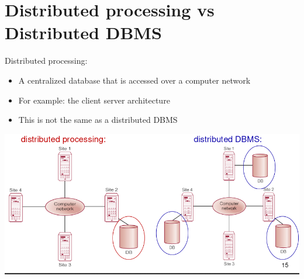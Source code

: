 \documentclass{article}[18pt]
\begin{document}
\section{Distributed processing vs Distributed DBMS}
Distributed processing:
\begin{itemize}
	\item A centralized database that is accessed over a computer network
	\item For example: the client server architecture
	\item This is not the same as a distributed DBMS
\end{itemize}
\begin{center}
	\includegraphics[scale=0.7]{processing}
\end{center}
\end{document}
